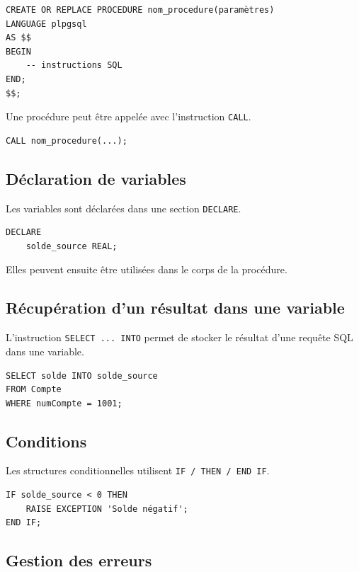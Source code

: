 \documentclass[11pt]{article}
\begin{document}
\begin{verbatim}
CREATE OR REPLACE PROCEDURE nom_procedure(paramètres)
LANGUAGE plpgsql
AS $$
BEGIN
    -- instructions SQL
END;
$$;
\end{verbatim}

Une procédure peut être appelée avec l’instruction \texttt{CALL}.

\begin{verbatim}
CALL nom_procedure(...);
\end{verbatim}

\bigskip

\subsection*{Déclaration de variables}

Les variables sont déclarées dans une section \texttt{DECLARE}.

\begin{verbatim}
DECLARE
    solde_source REAL;
\end{verbatim}

Elles peuvent ensuite être utilisées dans le corps de la procédure.

\bigskip

\subsection*{Récupération d’un résultat dans une variable}

L’instruction \texttt{SELECT ... INTO} permet de stocker le résultat
d’une requête SQL dans une variable.

\begin{verbatim}
SELECT solde INTO solde_source
FROM Compte
WHERE numCompte = 1001;
\end{verbatim}

\bigskip

\subsection*{Conditions}

Les structures conditionnelles utilisent \texttt{IF / THEN / END IF}.

\begin{verbatim}
IF solde_source < 0 THEN
    RAISE EXCEPTION 'Solde négatif';
END IF;
\end{verbatim}

\bigskip

\subsection*{Gestion des erreurs}
\end{document}
